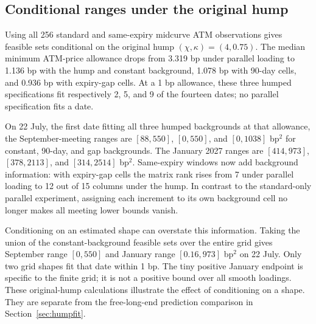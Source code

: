\subsection{Conditional ranges under the original hump}\label{app:shapeprofile}
Using all 256 standard and same-expiry midcurve ATM observations gives feasible sets conditional on the original hump $(\chi,\kappa)=(4,0.75)$. The median minimum ATM-price allowance drops from 3.319 bp under parallel loading to 1.136 bp with the hump and constant background, 1.078 bp with 90-day cells, and 0.936 bp with expiry-gap cells. At a 1 bp allowance, these three humped specifications fit respectively 2, 5, and 9 of the fourteen dates; no parallel specification fits a date.

On 22 July, the first date fitting all three humped backgrounds at that allowance, the September-meeting ranges are $[88,550]$, $[0,550]$, and $[0,1038]$ bp$^2$ for constant, 90-day, and gap backgrounds. The January 2027 ranges are $[414,973]$, $[378,2113]$, and $[314,2514]$ bp$^2$. Same-expiry windows now add background information: with expiry-gap cells the matrix rank rises from 7 under parallel loading to 12 out of 15 columns under the hump. In contrast to the standard-only parallel experiment, assigning each increment to its own background cell no longer makes all meeting lower bounds vanish.

Conditioning on an estimated shape can overstate this information. Taking the union of the constant-background feasible sets over the entire grid gives September range $[0,550]$ and January range $[0.16,973]$ bp$^2$ on 22 July. Only two grid shapes fit that date within 1 bp. The tiny positive January endpoint is specific to the finite grid; it is not a positive bound over all smooth loadings. These original-hump calculations illustrate the effect of conditioning on a shape. They are separate from the free-long-end prediction comparison in Section~\ref{sec:humpfit}.


